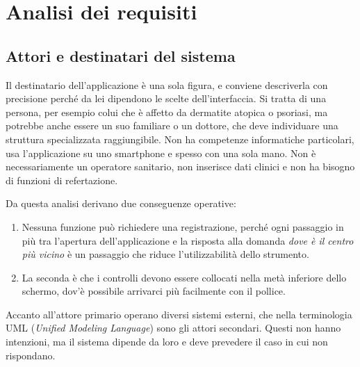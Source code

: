 \chapter{Analisi dei requisiti}\label{ch:analisi-dei-requisiti}

\section{Attori e destinatari del sistema}\label{sec:attori-sistema}

Il destinatario dell'applicazione è una sola figura, e conviene descriverla con precisione perché da lei dipendono le scelte dell'interfaccia.
Si tratta di una persona, per esempio colui che è affetto da dermatite atopica o psoriasi, ma potrebbe anche essere un suo
familiare o un dottore, che deve individuare una struttura specializzata raggiungibile.
Non ha competenze informatiche particolari, usa l'applicazione su uno smartphone e spesso con una sola mano.
Non è necessariamente un operatore sanitario, non inserisce dati clinici e non ha bisogno di funzioni di refertazione.

Da questa analisi derivano due conseguenze operative:
\begin{enumerate}
  \item Nessuna funzione può richiedere una registrazione, perché ogni passaggio in più tra l'apertura dell'applicazione e
  la risposta alla domanda \emph{dove è il centro più vicino} è un passaggio che riduce l'utilizzabilità dello strumento.
  \item La seconda è che i controlli devono essere collocati nella metà inferiore dello schermo,
  dov'è possibile arrivarci più facilmente con il pollice.
\end{enumerate}

Accanto all'attore primario operano diversi sistemi esterni, che nella terminologia UML (\textit{Unified Modeling Language}) sono gli attori secondari.
Questi non hanno intenzioni, ma il sistema dipende da loro e deve prevedere il caso in cui non rispondano.

